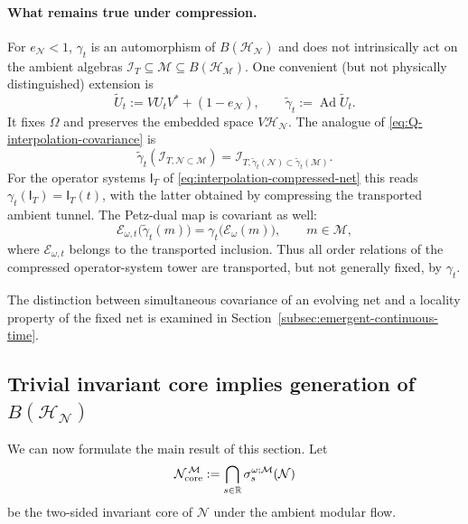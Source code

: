 \documentclass[a4paper,11pt]{article}
\theoremstyle{definition}
\newcommand{\mN}{\mathcal{N}}
\newcommand{\mI}{\mathcal{I}}
\newcommand{\mH}{\mathcal{H}}
\newcommand{\mM}{\mathcal{M}}
\newcommand{\mE}{\mathcal{E}}
\begin{document}
\paragraph{What remains true under compression.}
For $e_\mN<1$, $\gamma_t$ is an automorphism of
$B(\mH_\mN)$ and does not intrinsically act on the ambient
algebras $\mI_T\subseteq\mM\subseteq B(\mH_\mM)$.
One convenient (but not physically distinguished) extension is
\begin{equation}
 \widetilde U_t:=VU_tV^*+(1-e_\mN),
 \qquad \widetilde\gamma_t:=\operatorname{Ad}\widetilde U_t.
 \label{eq:Q-ambient-extended-flow}
\end{equation}
It fixes $\Omega$ and preserves the embedded space $V\mH_\mN$.
The analogue of \eqref{eq:Q-interpolation-covariance} is
\begin{equation}
 \widetilde\gamma_t(\mI_{T,\mN\subset\mM})
 =\mI_{T,\widetilde\gamma_t(\mN)\subset
              \widetilde\gamma_t(\mM)}.
 \label{eq:Q-compressed-tunnel-transport}
\end{equation}
For the operator systems $\mathsf I_T$ of
\eqref{eq:interpolation-compressed-net} this reads
$\gamma_t(\mathsf I_T)=\mathsf I_T(t)$, with the latter obtained
by compressing the transported ambient tunnel. The Petz-dual map
is covariant as well:
\begin{equation}
 \mE_{\omega,t}\bigl(\widetilde\gamma_t(m)\bigr)
 =\gamma_t\bigl(\mE_\omega(m)\bigr),
 \qquad m\in\mM,
 \label{eq:Q-Petz-covariance}
\end{equation}
where $\mE_{\omega,t}$ belongs to the transported inclusion.
Thus all order relations of the compressed operator-system tower
are transported, but not generally fixed, by $\gamma_t$.

The distinction between simultaneous covariance of an evolving net
and a locality property of the fixed net is examined in
Section~\ref{subsec:emergent-continuous-time}.

\subsection{Trivial invariant core implies generation of $B(\mH_{\mN})$}

We can now formulate the main result of this section. Let
\begin{equation}
    \mN_{\rm core}^{\,\mM}
    :=
    \bigcap_{s\in\mathbb R}
    \sigma_s^{\omega;\mM}(\mN)
    \label{eq:ambient-memory-probing}
\end{equation}
be the two-sided invariant core of $\mN$ under the ambient modular flow.
\end{document}
